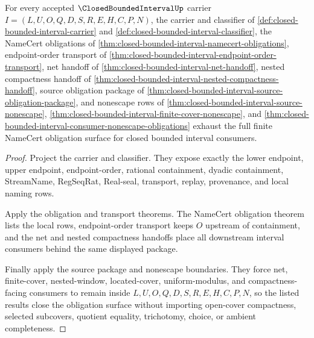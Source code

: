 \begin{theorem}
\label{thm:closed-bounded-interval-obligation-closure}
For every accepted $\ClosedBoundedIntervalUp$ carrier $I=(L,U,O,Q,D,S,R,E,H,C,P,N)$, the carrier and classifier of \autoref{def:closed-bounded-interval-carrier} and \autoref{def:closed-bounded-interval-classifier}, the NameCert obligations of \autoref{thm:closed-bounded-interval-namecert-obligations}, endpoint-order transport of \autoref{thm:closed-bounded-interval-endpoint-order-transport}, net handoff of \autoref{thm:closed-bounded-interval-net-handoff}, nested compactness handoff of \autoref{thm:closed-bounded-interval-nested-compactness-handoff}, source obligation package of \autoref{thm:closed-bounded-interval-source-obligation-package}, and nonescape rows of \autoref{thm:closed-bounded-interval-source-nonescape}, \autoref{thm:closed-bounded-interval-finite-cover-nonescape}, and \autoref{thm:closed-bounded-interval-consumer-nonescape-obligations} exhaust the full finite NameCert obligation surface for closed bounded interval consumers.
\end{theorem}
\begin{proof}
Project the carrier and classifier. They expose exactly the lower endpoint, upper endpoint, endpoint-order, rational containment, dyadic containment, StreamName, RegSeqRat, Real-seal, transport, replay, provenance, and local naming rows.

Apply the obligation and transport theorems. The NameCert obligation theorem lists the local rows, endpoint-order transport keeps $O$ upstream of containment, and the net and nested compactness handoffs place all downstream interval consumers behind the same displayed package.

Finally apply the source package and nonescape boundaries. They force net, finite-cover, nested-window, located-cover, uniform-modulus, and compactness-facing consumers to remain inside $L,U,O,Q,D,S,R,E,H,C,P,N$, so the listed results close the obligation surface without importing open-cover compactness, selected subcovers, quotient equality, trichotomy, choice, or ambient completeness.
\end{proof}

